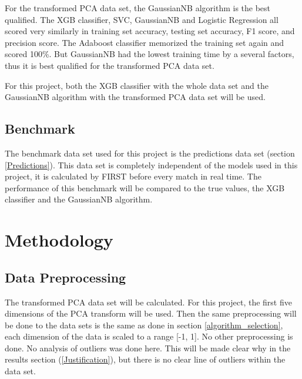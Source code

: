 \documentclass{article}
\begin{document}
\par
For the transformed PCA data set, the GaussianNB algorithm is the best qualified. The XGB classifier, SVC, GaussianNB and Logistic Regression all scored very similarly in training set accuracy, testing set accuracy, F1 score, and precision score. The Adaboost classifier memorized the training set again and scored 100\%. But GaussianNB had the lowest training time by a several factors, thus it is best qualified for the transformed PCA data set.

\par
For this project, both the XGB classifier with the whole data set and the GaussianNB algorithm with the transformed PCA data set will be used.


\subsection{Benchmark}
\par
The benchmark data set used for this project is the predictions data set (section \ref{Predictions}). This data set is completely independent of the models used in this project, it is calculated by FIRST before every match in real time. The performance of this benchmark will be compared to the true values, the XGB classifier and the GaussianNB algorithm.

\section{Methodology}

\subsection{Data Preprocessing} \label{Actual_Preprocessing}
\par
The transformed PCA data set will be calculated. For this project, the first five dimensions of the PCA transform will be used. Then the same preprocessing will be done to the data sets is the same as done in section \ref{algorithm_selection}, each dimension of the data is scaled to a range [-1, 1]. No other preprocessing is done. No analysis of outliers was done here. This will be made clear why in the results section (\ref{Justification}), but there is no clear line of outliers within the data set.
\end{document}
